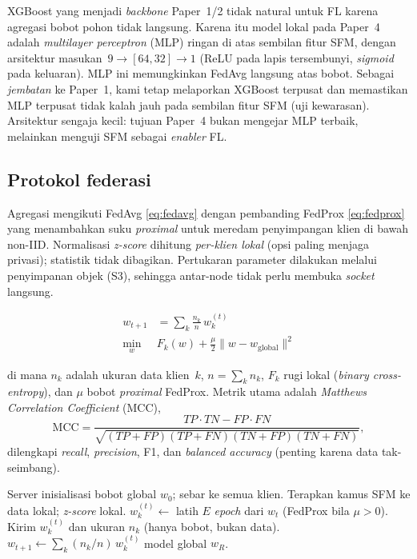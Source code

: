 \documentclass[11pt,a4paper]{article}
\begin{document}
XGBoost yang menjadi \emph{backbone} Paper~1/2 tidak natural untuk FL karena
agregasi bobot pohon tidak langsung. Karena itu model lokal pada Paper~4 adalah
\emph{multilayer perceptron} (MLP) ringan di atas sembilan fitur SFM, dengan
arsitektur masukan~$9 \rightarrow [64, 32] \rightarrow 1$ (ReLU pada lapis
tersembunyi, \emph{sigmoid} pada keluaran). MLP ini memungkinkan FedAvg langsung
atas bobot. Sebagai \emph{jembatan} ke Paper~1, kami tetap melaporkan XGBoost
terpusat dan memastikan MLP terpusat tidak kalah jauh pada sembilan fitur SFM
(uji kewarasan). Arsitektur sengaja kecil: tujuan Paper~4 bukan mengejar MLP
terbaik, melainkan menguji SFM sebagai \emph{enabler} FL.

\subsection{Protokol federasi}
\label{sec:protocol}

Agregasi mengikuti FedAvg \eqref{eq:fedavg} dengan pembanding FedProx
\eqref{eq:fedprox} yang menambahkan suku \emph{proximal} untuk meredam
penyimpangan klien di bawah non-IID. Normalisasi \emph{z-score} dihitung
\emph{per-klien lokal} (opsi paling menjaga privasi); statistik tidak dibagikan.
Pertukaran parameter dilakukan melalui penyimpanan objek (S3), sehingga antar-node
tidak perlu membuka \emph{socket} langsung.

\begin{align}
  w_{t+1} &= \sum_{k} \frac{n_k}{n}\, w_k^{(t)} \label{eq:fedavg}\\[2pt]
  \min_{w}\; & F_k(w) + \frac{\mu}{2}\lVert w - w_{\text{global}} \rVert^2 \label{eq:fedprox}
\end{align}

\noindent di mana $n_k$ adalah ukuran data klien~$k$, $n=\sum_k n_k$, $F_k$ rugi
lokal (\emph{binary cross-entropy}), dan $\mu$ bobot \emph{proximal} FedProx.
Metrik utama adalah \emph{Matthews Correlation Coefficient} (MCC),
\begin{equation}
  \mathrm{MCC} = \frac{TP\cdot TN - FP\cdot FN}
  {\sqrt{(TP{+}FP)(TP{+}FN)(TN{+}FP)(TN{+}FN)}},
  \label{eq:mcc}
\end{equation}
dilengkapi \emph{recall}, \emph{precision}, F1, dan \emph{balanced accuracy}
(penting karena data tak-seimbang).

\begin{algorithm}[t]
\caption{FedAvg/FedProx di ruang SFM (per \emph{run})}
\label{alg:fed}
\begin{algorithmic}[1]
\State Server inisialisasi bobot global $w_0$; sebar ke semua klien.
    \State Terapkan kamus SFM ke data lokal; \emph{z-score} lokal.
    \State $w_k^{(t)} \gets$ latih $E$ \emph{epoch} dari $w_t$ (FedProx bila $\mu>0$).
    \State Kirim $w_k^{(t)}$ dan ukuran $n_k$ (hanya bobot, bukan data).
  \EndFor
  \State $w_{t+1} \gets \sum_k (n_k/n)\, w_k^{(t)}$ 
\EndFor
\State \Return model global $w_R$.
\end{algorithmic}
\end{algorithm}
\end{document}
